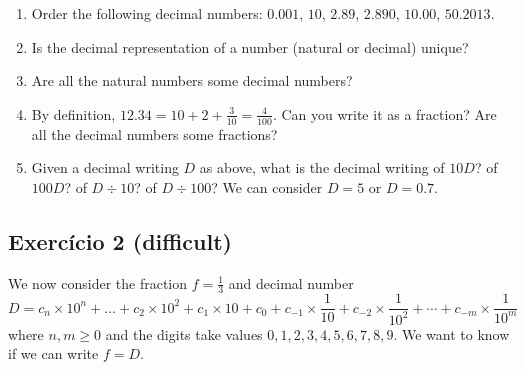 \begin{enumerate}
\item Order the following decimal numbers: $0.001$, $10$, $2.89$, $2.890$,
  $10.00$, $50.2013$.
\item Is the decimal representation of a number (natural or decimal) unique?
\item Are all the natural numbers some decimal numbers?
\item
  By definition, $12.34 = 10 + 2 + \frac{3}{10} = \frac{4}{100}$. Can you write
  it as a fraction? Are all the decimal numbers some fractions?
\item Given a decimal writing $D$ as above, what is the decimal
  writing of $10D$? of $100D$? of $D \div 10$? of $D \div 100$?
  We can consider $D=5$ or $D=0.7$.
\end{enumerate}

\subsection*{Exercício 2 (difficult)}

We now consider the fraction $f=\frac{1}{3}$ and decimal number
$$D = {c_n \times 10^n} + \dots + {c_2 \times 10^2} + c_1 \times 10 + c_0 +
{c_{-1} \times \frac{1}{10}} +
{c_{-2} \times \frac{1}{10^2}} + \cdots +
{c_{-m} \times \frac{1}{10^{m}}}
$$
where $n,m \geq 0$ and the digits take values $0,1,2,3,4,5,6,7,8,9$. We want
to know if we can write $f = D$.


